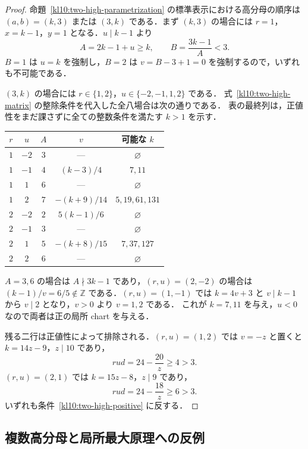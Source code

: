 \begin{proof}
命題~\ref{kl10:two-high-parametrization} の標準表示における高分母の順序は
$(a,b)=(k,3)$ または $(3,k)$ である．まず $(k,3)$ の場合には $r=1$，
$x=k-1$，$y=1$ となる．$u\mid k-1$ より
\[
 A=2k-1+u\geq k,\qquad B=\frac{3k-1}{A}<3.
\]
$B=1$ は $u=k$ を強制し，$B=2$ は $v=B-3+1=0$ を強制するので，いずれも不可能である．

$(3,k)$ の場合には $r\in\{1,2\}$，$u\in\{-2,-1,1,2\}$ である．
式~\eqref{kl10:two-high-matrix} の整除条件を代入した全八場合は次の通りである．
表の最終列は，正値性をまだ課さずに全ての整数条件を満たす $k>1$ を示す．
\begin{center}
\small
\begin{tabular}{ccccc}
$r$ & $u$ & $A$ & $v$ & 可能な $k$ \\
\hline
$1$ & $-2$ & $3$ & --- & $\varnothing$ \\
$1$ & $-1$ & $4$ & $(k-3)/4$ & $7,11$ \\
$1$ & $1$ & $6$ & --- & $\varnothing$ \\
$1$ & $2$ & $7$ & $-(k+9)/14$ & $5,19,61,131$ \\
$2$ & $-2$ & $2$ & $5(k-1)/6$ & $\varnothing$ \\
$2$ & $-1$ & $3$ & --- & $\varnothing$ \\
$2$ & $1$ & $5$ & $-(k+8)/15$ & $7,37,127$ \\
$2$ & $2$ & $6$ & --- & $\varnothing$
\end{tabular}
\end{center}
$A=3,6$ の場合は $A\nmid3k-1$ であり，$(r,u)=(2,-2)$ の場合は
$(k-1)/v=6/5\notin\mathbb Z$ である．$(r,u)=(1,-1)$ では
$k=4v+3$ と $v\mid k-1$ から $v\mid2$ となり，$v>0$ より $v=1,2$ である．
これが $k=7,11$ を与え，$u<0$ なので両者は正の局所 chart を与える．

残る二行は正値性によって排除される．$(r,u)=(1,2)$ では
$v=-z$ と置くと $k=14z-9$，$z\mid10$ であり，
\[
 rud=24-\frac{20}{z}\geq4>3.
\]
$(r,u)=(2,1)$ では $k=15z-8$，$z\mid9$ であり，
\[
 rud=24-\frac{18}{z}\geq6>3.
\]
いずれも条件~\eqref{kl10:two-high-positive} に反する．
\end{proof}

\subsection{複数高分母と局所最大原理への反例}
\label{kl10:counterexamples}

